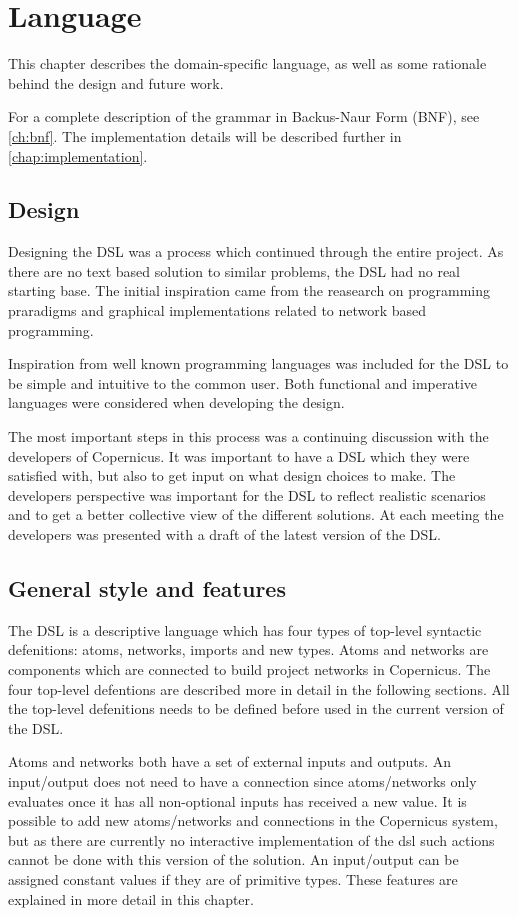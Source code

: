 \chapter{Language}\label{chap:language}
This chapter describes the domain-specific language, as well as some
rationale behind the design and future work.

For a complete description of the grammar in Backus-Naur Form (BNF),
see \autoref{ch:bnf}. The implementation details will be described
further in \autoref{chap:implementation}.

\section{Design}
Designing the DSL was a process which continued through the entire
project. As there are no text based solution to similar problems, the
DSL had no real starting base. The initial inspiration came from the
reasearch on programming praradigms and graphical implementations
related to network based programming.

Inspiration from well known programming languages was included for the
DSL to be simple and intuitive to the common user. Both functional and
imperative languages were considered when developing the design.

The most important steps in this process was a continuing discussion
with the developers of Copernicus. It was important to have a DSL
which they were satisfied with, but also to get input on what design
choices to make. The developers perspective was important for the DSL
to reflect realistic scenarios and to get a better collective view of
the different solutions. At each meeting the developers was presented
with a draft of the latest version of the DSL.

\section{General style and features}
The DSL is a descriptive language which has four types of top-level
syntactic defenitions: atoms, networks, imports and new types. Atoms
and networks are components which are connected to build project
networks in Copernicus. The four top-level defentions are described
more in detail in the following sections. All the top-level
defenitions needs to be defined before used in the current version of
the DSL.

Atoms and networks both have a set of external inputs and outputs. An
input/output does not need to have a connection since atoms/networks
only evaluates once it has all non-optional inputs has received a new
value. It is possible to add new atoms/networks and connections in the
Copernicus system, but as there are currently no interactive
implementation of the dsl such actions cannot be done with this
version of the solution. An input/output can be assigned constant
values if they are of primitive types. These features are explained in
more detail in this chapter.


